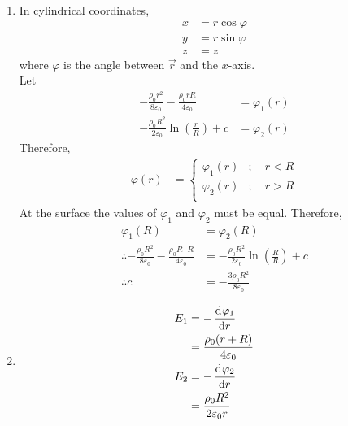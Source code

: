 \documentclass[fleqn, a4paper, 12pt, twoside]{article}
\theoremstyle{definition}
\theoremstyle{theorem}
\begin{document}
\begin{solution}
	\begin{enumerate}[leftmargin=*]
		\item 
			In cylindrical coordinates,
			\begin{align*}
				x & = r \cos \varphi \\
				y & = r \sin \varphi \\
				z & = z
			\end{align*}
			where $\varphi$ is the angle between $\overrightarrow{r}$ and the $x$-axis.\\
			Let
			\begin{align*}
				-\frac{\rho_0 r^2}{8 \varepsilon_0} - \frac{\rho_0 r R}{4 \varepsilon_0} & = \varphi_1(r) \\
				-\frac{\rho_0 R^2}{2 \varepsilon_0} \ln \left( \frac{r}{R} \right) + c   & = \varphi_2(r)
			\end{align*}
			Therefore,
			\begin{align*}
				\varphi(r) &= 
					\begin{cases}
						\varphi_1(r) & ;\quad r < R \\
						\varphi_2(r) & ;\quad r > R \\
					\end{cases}
			\end{align*}
			At the surface the values of $\varphi_1$ and $\varphi_2$ must be equal.
			Therefore,
			\begin{align*}
				\varphi_1(R)                                                                              & = \varphi_2(R)                                                           \\
				\therefore -\frac{\rho_0 R^2}{8 \varepsilon_0} - \frac{\rho_0 R \cdot R}{4 \varepsilon_0} & = -\frac{\rho_0 R^2}{2 \varepsilon_0} \ln \left( \frac{R}{R} \right) + c \\
				\therefore c                                                                              & = -\frac{3 \rho_0 R^2}{8 \varepsilon_0}
			\end{align*}
		\item
			\begin{align*}
				E_1 & = -\dod{\varphi_1}{r}                    \\
                                    & = \frac{\rho_0 (r + R)}{4 \varepsilon_0} \\
				E_2 & = -\dod{\varphi_2}{r}                    \\
                                    & = \frac{\rho_0 R^2}{2 \varepsilon_0 r}

\end{align*}
\end{enumerate}
\end{solution}
\end{document}
